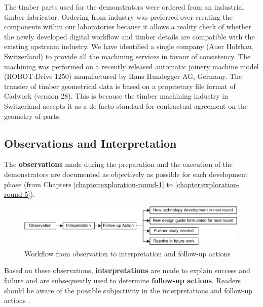 The timber parts used for the demonstrators were ordered from an industrial timber fabricator. Ordering from industry was preferred over creating the components within our laboratories because it allows a reality check of whether the newly developed digital workflow and timber details are compatible with the existing upstream industry. We have identified a single company (Auer Holzbau, Switzerland) to provide all the machining services in favour of consistency. The machining was performed on a recently released automatic joinery machine model (ROBOT-Drive 1250) manufactured by Hans Hundegger AG, Germany. The transfer of timber geometrical data is based on a proprietary file format of Cadwork (version 28). This is because the timber machining industry in Switzerland accepts it as a de facto standard for contractual agreement on the geometry of parts.

\subsection{Observations and Interpretation}
\label{subsection:methodology-observations-and-interpretation}

The \textbf{observations }made during the preparation and the execution of the demonstrators are documented as objectively as possible for each development phase (from Chapters \ref{chapter:exploration-round-1} to \ref{chapter:exploration-round-5}). 


\begin{figure}[ht]
    \centering
    \includegraphics[width=0.99\textwidth]{images/03/Observation to followup actions.pdf}
    \caption{Workflow from observation to interpretation and follow-up actions}
    \label{fig:observation_andinterpretation_workflow}
\end{figure}


Based on these observations, \textbf{interpretations }are made to explain success and failure and are subsequently used to determine \textbf{follow-up actions}. Readers should be aware of the possible subjectivity in the interpretations and follow-up actions . 

